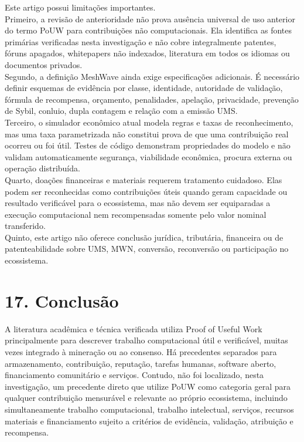 \documentclass[12pt,a4paper]{article}
\begin{document}
Este artigo possui limitações importantes.\\

Primeiro, a revisão de anterioridade não prova ausência universal de uso anterior do termo PoUW para contribuições não computacionais. Ela identifica as fontes primárias verificadas nesta investigação e não cobre integralmente patentes, fóruns apagados, whitepapers não indexados, literatura em todos os idiomas ou documentos privados.\\

Segundo, a definição MeshWave ainda exige especificações adicionais. É necessário definir esquemas de evidência por classe, identidade, autoridade de validação, fórmula de recompensa, orçamento, penalidades, apelação, privacidade, prevenção de Sybil, conluio, dupla contagem e relação com a emissão UMS.\\

Terceiro, o simulador econômico atual modela regras e taxas de reconhecimento, mas uma taxa parametrizada não constitui prova de que uma contribuição real ocorreu ou foi útil. Testes de código demonstram propriedades do modelo e não validam automaticamente segurança, viabilidade econômica, procura externa ou operação distribuída.\\

Quarto, doações financeiras e materiais requerem tratamento cuidadoso. Elas podem ser reconhecidas como contribuições úteis quando geram capacidade ou resultado verificável para o ecossistema, mas não devem ser equiparadas a execução computacional nem recompensadas somente pelo valor nominal transferido.\\

Quinto, este artigo não oferece conclusão jurídica, tributária, financeira ou de patenteabilidade sobre UMS, MWN, conversão, reconversão ou participação no ecossistema.\\


\section{17. Conclusão}

A literatura acadêmica e técnica verificada utiliza Proof of Useful Work principalmente para descrever trabalho computacional útil e verificável, muitas vezes integrado à mineração ou ao consenso. Há precedentes separados para armazenamento, contribuição, reputação, tarefas humanas, software aberto, financiamento comunitário e serviços. Contudo, não foi localizado, nesta investigação, um precedente direto que utilize PoUW como categoria geral para qualquer contribuição mensurável e relevante ao próprio ecossistema, incluindo simultaneamente trabalho computacional, trabalho intelectual, serviços, recursos materiais e financiamento sujeito a critérios de evidência, validação, atribuição e recompensa.\\
\end{document}

